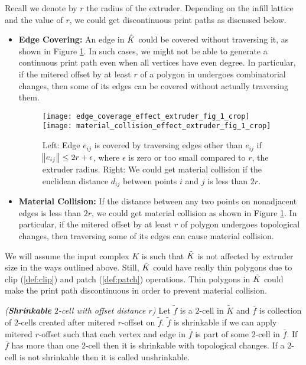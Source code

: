 Recall we denote by $r$ the radius of the extruder.
Depending on the infill lattice and the value of $r$, we could get discontinuous print paths as discussed below.
\begin{itemize}
   \item {\bfseries Edge Covering:}
     An edge in $\hat{K}$ could be covered without traversing it, as shown in Figure \ref{fig:extruder_size_effect}.
     In such cases, we might not be able to generate a continuous print path even when all vertices have even degree.
     In particular, if the mitered offset by at least $r$ of a polygon in undergoes combinatorial changes, then some of its edges can be covered without actually traversing them.
     \begin{figure}[htp!] 
       \centering
       \texttt{[image: edge\_coverage\_effect\_extruder\_fig\_1\_crop]}
       \quad
       \texttt{[image: material\_collision\_effect\_extruder\_fig\_1\_crop]}
       \caption{
         Left: Edge $e_{ij}$ is covered by traversing edges other than $e_{ij}$ if $\norm{e_{ij}} \leq 2r + \epsilon$, where $\epsilon$ is zero or too small compared to $r$, the extruder radius.
         Right: We could get material collision if the euclidean distance $d_{ij}$ between points $i$ and $j$ is less than $2r$.}
		
       \label{fig:extruder_size_effect}
     \end{figure}
            
   \item {\bfseries Material Collision:} If the distance between any two points on nonadjacent edges is less than $2r$, we could get material collision as shown in Figure \ref{fig:extruder_size_effect}.
     In particular, if the mitered offset by at least $r$ of polygon undergoes topological changes, then traversing some of its edges can cause material collision. 
\end{itemize} 

We will assume the input complex $K$ is such that $\tilde{K}$ is not affected by extruder size in the ways outlined above. 
Still, $\tilde{K}$ could have really thin polygons due to clip (\cref{def:clip}) and patch (\cref{def:patch}) operations.
Thin polygons in $\tilde{K}$ could make the print path discontinuous in order to prevent material collision.
\begin{defn}{\label{def:shrinkable}}
  \emph{({\bfseries Shrinkable} $2$-cell with offset distance $r$)}
  Let $\tilde{f}$ is a $2$-cell in $\tilde{K}$ and $\bar{f}$ is collection of $2$-cells created after mitered $r$-offset on $\tilde{f}$. $\tilde{f}$ is shrinkable if we can apply mitered $r$-offset such that each vertex and edge in $\bar{f}$ is part of some $2$-cell in $\bar{f}$. If $\bar{f}$ has more than one   $2$-cell then it is shrinkable with topological changes. If a $2$-cell is not shrinkable then it is called unshrinkable.  
\end{defn} 

